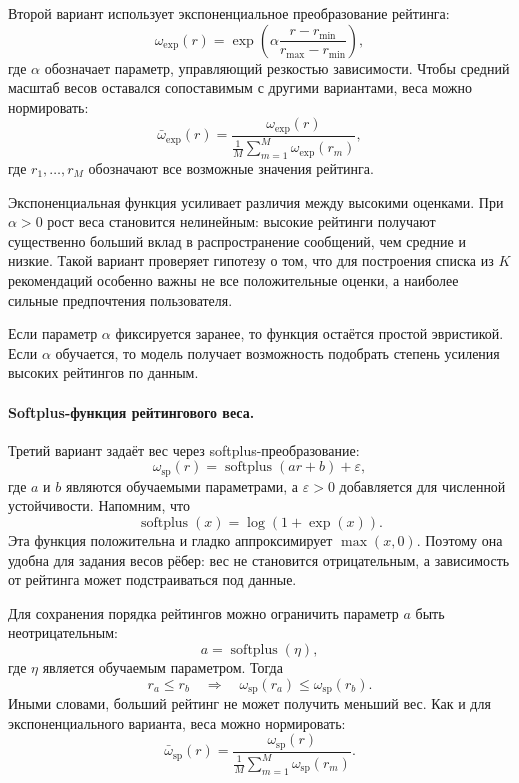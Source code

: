 \documentclass[12pt,fleqn]{article}
\begin{document}
Второй вариант использует экспоненциальное преобразование рейтинга:
$$
    \omega_{\mathrm{exp}}(r)
    =
    \exp\left(
        \alpha
        \frac{r-r_{\min}}{r_{\max}-r_{\min}}
    \right),
$$
где $\alpha$ обозначает параметр, управляющий резкостью зависимости. Чтобы средний
масштаб весов оставался сопоставимым с другими вариантами, веса можно
нормировать:
$$
    \bar\omega_{\mathrm{exp}}(r)
    =
    \frac{
        \omega_{\mathrm{exp}}(r)
    }{
        \frac{1}{M}
        \sum\limits_{m=1}^{M}
        \omega_{\mathrm{exp}}(r_m)
    },
$$
где $r_1,\ldots,r_M$ обозначают все возможные значения рейтинга.

Экспоненциальная функция усиливает различия между высокими оценками. При
$\alpha>0$ рост веса становится нелинейным: высокие рейтинги получают
существенно больший вклад в распространение сообщений, чем средние и низкие.
Такой вариант проверяет гипотезу о том, что для построения списка из $K$ рекомендаций особенно
важны не все положительные оценки, а наиболее сильные предпочтения
пользователя.

Если параметр $\alpha$ фиксируется заранее, то функция остаётся простой
эвристикой. Если $\alpha$ обучается, то модель получает возможность подобрать
степень усиления высоких рейтингов по данным.

\paragraph{Softplus-функция рейтингового веса.}

Третий вариант задаёт вес через softplus-преобразование:
$$
    \omega_{\mathrm{sp}}(r)
    =
    \operatorname{softplus}
    \left(
        a r + b
    \right)
    +
    \varepsilon,
$$
где $a$ и $b$ являются обучаемыми параметрами, а $\varepsilon>0$ добавляется для
численной устойчивости. Напомним, что
$$
    \operatorname{softplus}(x)
    =
    \log(1+\exp(x)).
$$
Эта функция положительна и гладко аппроксимирует $\max(x,0)$. Поэтому она
удобна для задания весов рёбер: вес не становится отрицательным, а зависимость
от рейтинга может подстраиваться под данные.

Для сохранения порядка рейтингов можно ограничить параметр $a$ быть
неотрицательным:
$$
    a=\operatorname{softplus}(\eta),
$$
где $\eta$ является обучаемым параметром. Тогда
$$
    r_a\leq r_b
    \quad\Rightarrow\quad
    \omega_{\mathrm{sp}}(r_a)
    \leq
    \omega_{\mathrm{sp}}(r_b).
$$
Иными словами, больший рейтинг не может получить меньший вес. Как и для
экспоненциального варианта, веса можно нормировать:
$$
    \bar\omega_{\mathrm{sp}}(r)
    =
    \frac{
        \omega_{\mathrm{sp}}(r)
    }{
        \frac{1}{M}
        \sum\limits_{m=1}^{M}
        \omega_{\mathrm{sp}}(r_m)
    }.
$$
\end{document}
